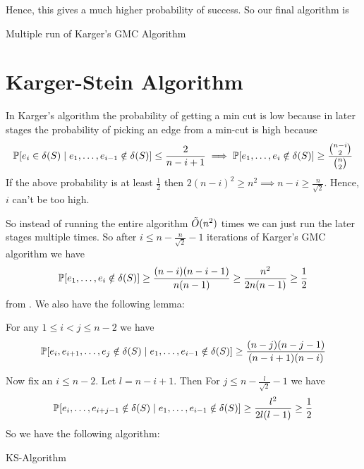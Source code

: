 Hence, this gives a much higher probability of success. So our final algorithm is
\begin{algorithm}
	\caption{Multiple run of Karger's GMC Algorithm}
\end{algorithm}
\section{Karger-Stein Algorithm}
In Karger's algorithm the probability of getting a min cut is low because in later stages the probability of picking an edge from a min-cut is high because $$\mathbb{P}[e_i\in \delta(S)\mid e_1,\dots,e_{i-1}\notin \delta(S)]  \leq \frac{2}{n-i+1}\implies \mathbb{P}[e_1,\dots, e_i\notin \delta(S)]\geq \frac{\binom{n-i}2}{\binom{n}{2}}$$  If the above probability is at least $\frac12$ then $2(n-i)^2\geq n^2\implies n-i\geq \frac{n}{\sqrt{2}}$. Hence, $i$ can't be too high.

So instead of running the entire algorithm $\tilde{O}(n^2)$ times we can just run the later stages multiple times. So after $i\leq n-\frac{n}{\sqrt{2}}-1$ iterations of Karger's GMC algorithm we have $$\mathbb{P}[e_1,\dots, e_i\notin\delta(S)]\geq \frac{(n-i)(n-i-1)}{n(n-1)}\geq \frac{n^2}{2n(n-1)}\geq \frac12$$ from . We also have the following lemma:
\begin{lemma}{}{}
	For any $1\leq i<j\leq n-2$ we have $$\mathbb{P}[e_i,e_{i+1},\dots, e_j\notin \delta(S)\mid e_1,\dots,e_{i-1}\notin \delta(S)]  \geq \frac{(n-j)(n-j-1)}{(n-i+1)(n-i)}$$
\end{lemma}
Now fix an $i\leq n-2$. Let $l=n-i+1$. Then For $j\leq n-\frac{l}{\sqrt{2}}-1$ we have $$\mathbb{P}[e_i,\dots, e_{i+j-1}\notin\delta(S)\mid e_1,\dots, e_{i-1}\notin \delta(S)]\geq \frac{l^2}{2l(l-1)}\geq \frac12$$So we have the following algorithm:
\begin{algorithm}
	\caption{KS-Algorithm}
\end{algorithm}

